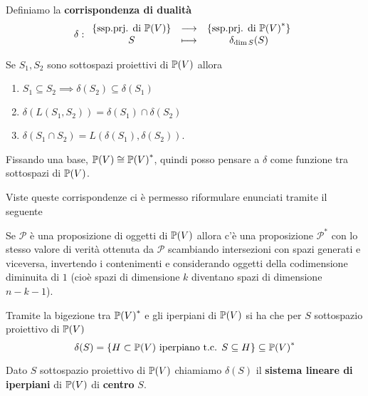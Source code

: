 \begin{multicols*}{2}
    \begin{definition}
    Definiamo la \textbf{corrispondenza di dualit\`a}
    \[\delta:\begin{array}{ccc} {\{\text{ssp.prj. di }{\mathbb{P}(V)}\}} & \longrightarrow & {\{\text{ssp.prj. di }{\mathbb{P}(V)}^*\}}\\ {S} & \longmapsto & {\delta_{\dim S}(S)} \end{array}\]
    \end{definition}

    \begin{proposition}
    Se $S_1,S_2$ sono sottospazi proiettivi di ${\mathbb{P}(V)}$ allora
    \begin{enumerate}
    \item $S_1\subseteq S_2\implies \delta(S_2)\subseteq \delta(S_1)$
    \item $\delta(L(S_1,S_2))=\delta(S_1)\cap\delta(S_2)$
    \item $\delta(S_1\cap S_2)=L(\delta(S_1),\delta(S_2))$.
    \end{enumerate}
    \end{proposition}

    \begin{remark}
    Fissando una base, ${\mathbb{P}(V)}\cong{\mathbb{P}(V)}^*$, quindi posso pensare a $\delta$ come funzione tra sottospazi di ${\mathbb{P}(V)}$.
    \end{remark}

    \noindent
    Viste queste corrispondenze ci \`e permesso riformulare enunciati tramite il seguente

    \begin{theorem}
    Se $\mathcal{P}$ \`e una proposizione di oggetti di ${\mathbb{P}(V)}$ allora c'\`e una proposizione $\mathcal{P}^*$ con lo stesso valore di verit\`a ottenuta da $\mathcal{P}$ scambiando intersezioni con spazi generati e viceversa, invertendo i contenimenti e considerando oggetti della codimensione diminuita di $1$ (cio\`e spazi di dimensione $k$ diventano spazi di dimensione $n-k-1$).
    \end{theorem}

    \begin{proposition}
    Tramite la bigezione tra ${\mathbb{P}(V)}^*$ e gli iperpiani di ${\mathbb{P}(V)}$ si ha che per $S$ sottospazio proiettivo di ${\mathbb{P}(V)}$
    \[\delta(S)=\{H\subset {\mathbb{P}(V)}\text{ iperpiano t.c. }S\subseteq H\}\subseteq {\mathbb{P}(V)}^*\]
    \end{proposition}

    \begin{definition}
    Dato $S$ sottospazio proiettivo di ${\mathbb{P}(V)}$ chiamiamo $\delta(S)$ il \textbf{sistema lineare di iperpiani} di ${\mathbb{P}(V)}$ di \textbf{centro} $S$.
    \end{definition}


\end{multicols*}
